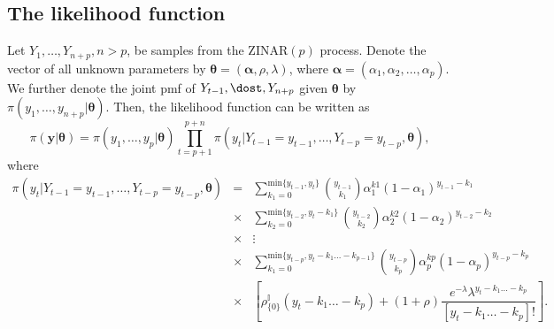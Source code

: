 \documentclass[11pt]{article}
\begin{document}
\begin{enumerate}
\subsection{The likelihood function}
Let $Y_1, \dots, Y_{n+p}, n>p$, be samples from the $\mathrm{ZINAR}(p)$ process. Denote the vector of all unknown parameters by $\boldsymbol{\theta} = (\boldsymbol{\alpha}, \rho, \lambda)$, where $\boldsymbol{\alpha} = (\alpha_{1}, \alpha_{2}, \dots, \alpha_{p})$. We further denote the joint pmf of $Y_{t-1}, \dost, Y_{n+p}$ given $\boldsymbol{\theta}$ by $\pi(y_1, \dots, y_{n+p}|\boldsymbol{\theta})$. Then, the likelihood function can be written as
\\
\begin{equation}
\pi(\boldsymbol{y}|\boldsymbol{\theta}) = \pi(y_1, \dots, y_p|\boldsymbol{\theta}) \prod_{t = p +1}^{p+n}\pi\left(y_t|Y_{t-1} = y_{t-1}, \dots, Y_{t-p} = y_{t-p}, \boldsymbol{\theta}\right),
\end{equation}
where
\begin{eqnarray}
\pi(y_t|Y_{t-1} = y_{t-1}, \dots, Y_{t-p} = y_{t-p}, \boldsymbol{\theta}) &=& \sum_{k_1=0}^{\mathrm{min}\{y_{t-1},
y_{t}\}}\binom{y_{t-1}}{k_1}\alpha^{k1}_{1}(1-\alpha_{1})^{y_{t-1} - k_1}\nonumber\\
&\times& \sum_{k_2=0}^{\mathrm{min}\{y_{t-2},
y_{t} - k_1\}}\binom{y_{t-2}}{k_2}\alpha^{k2}_{2}(1-\alpha_{2})^{y_{t-2} - k_2}\nonumber\\
&\times& \vdots\nonumber\\
&\times& \sum_{k_1=0}^{\mathrm{min}\{y_{t-p},
y_{t} - k_1 \dots -k_{p-1}\}}\binom{y_{t-p}}{k_p}\alpha^{kp}_{p}(1-\alpha_{p})^{y_{t-p} - k_p}\nonumber\\
&\times& \left[\rho^{\mathbb{I}}_{\{0\}}(y_{t} - k_1\dots-k_p) + (1 +\rho)\dfrac{e^{-\lambda}\lambda^{y_{t} - k_1 \dots -k_p}}{[y_{t} - k_1 \dots -k_p]!}  \right].\nonumber\\
&&
\end{eqnarray}


\end{enumerate}
\end{document}
